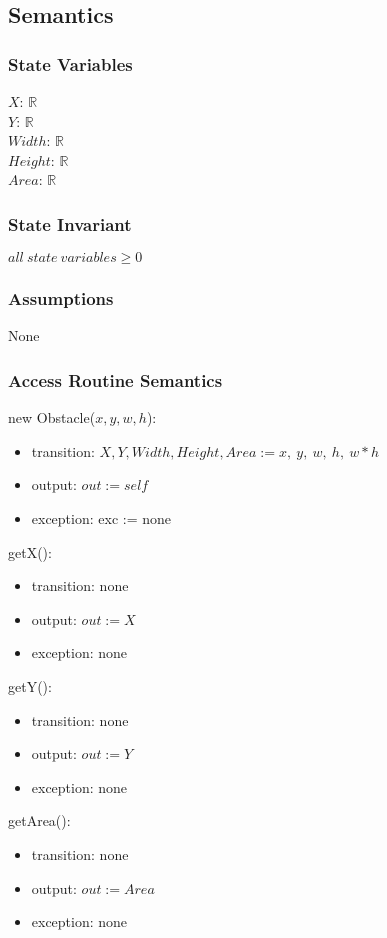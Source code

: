 \documentclass[12pt]{article}
\begin{document}
\subsection*{Semantics}
\subsubsection*{State Variables}
$\mathit{X}$: $\mathbb{R}$\\
$\mathit{Y}$: $\mathbb{R}$\\
$\mathit{Width}$: $\mathbb{R}$\\
$\mathit{Height}$: $\mathbb{R}$\\
$\mathit{Area}$: $\mathbb{R}$
\subsubsection*{State Invariant}
$all\ state\ variables \geq 0$
\subsubsection*{Assumptions}
None
\subsubsection*{Access Routine Semantics}
\noindent new Obstacle($\mathit{x}, \mathit{y}, \mathit{w}, \mathit{h}$):
\begin{itemize}
\item transition: $\mathit{X}, \mathit{Y}, \mathit{Width}, \mathit{Height}, \mathit{Area} := x,\ y,\ w,\ h,\ w * h$
\item output: $out := \mathit{self}$
\item exception: exc := none
\end{itemize}

\noindent getX():
\begin{itemize}
\item transition: none
\item output: $out := X$
\item exception: none
\end{itemize}

\noindent getY():
\begin{itemize}
\item transition: none
\item output: $out := Y$
\item exception: none
\end{itemize}

\noindent getArea():
\begin{itemize}
\item transition: none
\item output: $out := Area$
\item exception: none
\end{itemize}
\end{document}
